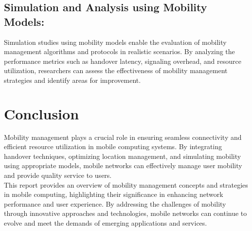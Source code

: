 \documentclass[12pt]{report}
\begin{document}
\subsection*{Simulation and Analysis using Mobility Models:} Simulation studies using mobility models enable the evaluation of mobility management algorithms and protocols in realistic scenarios. By analyzing the performance metrics such as handover latency, signaling overhead, and resource utilization, researchers can assess the effectiveness of mobility management strategies and identify areas for improvement.\cite{future}

\newpage
\section*{Conclusion}
Mobility management plays a crucial role in ensuring seamless connectivity and efficient resource utilization in mobile computing systems. By integrating handover techniques, optimizing location management, and simulating mobility using appropriate models, mobile networks can effectively manage user mobility and provide quality service to users.\\ 

This report provides an overview of mobility management concepts and strategies in mobile computing, highlighting their significance in enhancing network performance and user experience. By addressing the challenges of mobility through innovative approaches and technologies, mobile networks can continue to evolve and meet the demands of emerging applications and services.
\end{document}
